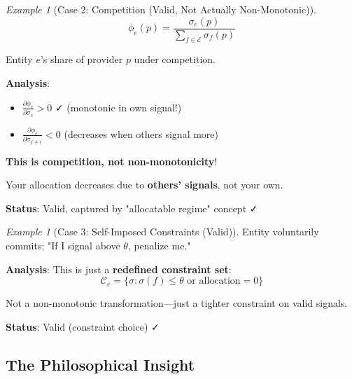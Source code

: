 \documentclass[11pt,a4paper]{article}
\theoremstyle{definition}
\theoremstyle{remark}
\newtheorem{example}[theorem]{Example}
\newcommand{\E}{\mathcal{E}}
\newcommand{\C}{\mathcal{C}}
\begin{document}
\begin{example}[Case 2: Competition (Valid, Not Actually Non-Monotonic)]
\[ \phi_e(p) = \frac{\sigma_e(p)}{\sum_{f \in \E} \sigma_f(p)} \]

Entity $e$'s share of provider $p$ under competition.

\textbf{Analysis}:
\begin{itemize}
\item $\frac{\partial \phi_e}{\partial \sigma_e} > 0$ ✓ (monotonic in own signal!)
\item $\frac{\partial \phi_e}{\partial \sigma_{f \ne e}} < 0$ (decreases when others signal more)
\end{itemize}

\textbf{This is competition, not non-monotonicity}!

Your allocation decreases due to \textbf{others' signals}, not your own.

\textbf{Status}: Valid, captured by "allocatable regime" concept ✓
\end{example}

\begin{example}[Case 3: Self-Imposed Constraints (Valid)]
Entity voluntarily commits: "If I signal above $\theta$, penalize me."

\textbf{Analysis}: This is just a \textbf{redefined constraint set}:
\[ \C_e = \{\sigma : \sigma(f) \le \theta \text{ or allocation} = 0\} \]

Not a non-monotonic transformation—just a tighter constraint on valid signals.

\textbf{Status}: Valid (constraint choice) ✓
\end{example}

\subsection{The Philosophical Insight}

\begin{center}
\end{center}
\end{document}
